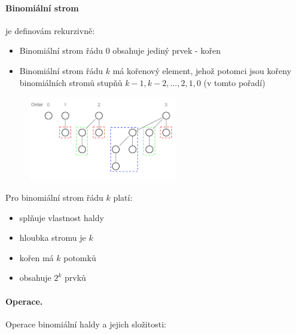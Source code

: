 \paragraph{Binomiální strom} je definovám rekurzivně:

\begin{itemize}[itemsep=0pt, topsep=2pt]
    \item Binomiální strom řádu 0 obsahuje jediný prvek - kořen
    \item Binomiální strom řádu $k$ má kořenový element, jehož potomci jsou kořeny binomiálních stromů stupňů $k-1, k-2, \hdots, 2, 1, 0$ (v tomto pořadí)
\end{itemize}

\begin{figure}
    \vspace{-20px}
    \begin{center}
        \includegraphics[width=65mm]{spolecne/01/images/Binomial_Trees}
    \end{center}
    \vspace{-30pt}
    \label{fig:binom_heap}
    \vspace{-60pt}
\end{figure}

\noindent Pro binomiální strom řádu $k$ platí:

\begin{itemize}[itemsep=0pt, topsep=2pt]
    \item splňuje vlastnost haldy
    \item hloubka stromu je $k$
    \item kořen má $k$ potomků
    \item obsahuje $2^k$ prvků
\end{itemize}

\paragraph{Operace.} Operace binomiální haldy a jejich složitosti:

